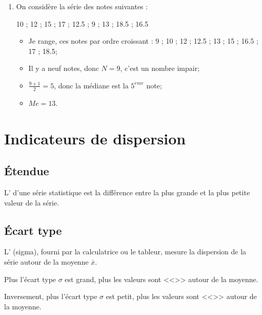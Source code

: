 \documentclass[12pt,a4paper]{article}
\begin{document}
\begin{myexs}
	\begin{enumerate}
		\item On considère la série des notes suivantes : 
		
		\num{10} ; \num{12} ; \num{15} ; \num{17} ; \num{12.5} ; \num{9} ; \num{13} ; \num{18.5} ; \num{16.5}
		
		\begin{itemize}
			\item Je range, ces notes par ordre croissant :
			\num{9} ; \num{10} ; \num{12} ; \num{12.5} ; \num{13} ; \num{15} ; \num{16.5} ; \num{17} ; \num{18.5};
			
			\item Il y a neuf notes, donc $N = 9$, c'est un nombre impair;
			\item $\frac{9+1}{2} = 5$, donc la médiane est la $5^{eme}$ note;
			\item $Me = 13$.
		\end{itemize}
		
	\end{enumerate}
\end{myexs}

\section{Indicateurs de dispersion}

\subsection{\'Etendue}

\begin{mydef}
	L' d'une série statistique est la différence entre la plus grande et la plus petite valeur de la série.
\end{mydef}	

\subsection{\'Ecart type}

\begin{mydef}
	L' (sigma), fourni par la calculatrice ou le tableur, mesure la dispersion de la série autour de la moyenne $\bar{x}$. 
	
	Plus l'écart type $\sigma$ est grand, plus les valeurs sont <<>> autour de la moyenne. 
	
	Inversement, plus l'écart type $\sigma$ est petit, plus les valeurs sont <<>> autour de la moyenne.
\end{mydef}	
\end{document}
